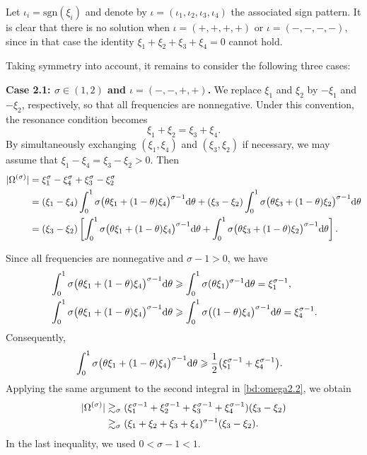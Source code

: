 \documentclass[UTF-8,reqno]{amsart}
\numberwithin{equation}{section}
\theoremstyle{definition}
\def\dif{{\mathord{{\rm d}}}}
\def\geq{\geqslant}
\def\dif{{\mathord{{\rm d}}}}
\def\geq{\geqslant}
\begin{document}
Let $\iota_i = \mathrm{sgn}(\xi_i)$ and denote by 
$\iota = (\iota_1,\iota_2,\iota_3,\iota_4)$ 
the associated sign pattern. 
It is clear that there is no solution when 
$\iota = (+,+,+,+)$ or $\iota = (-,-,-,-)$, 
since in that case the identity 
$\xi_1+\xi_2+\xi_3+\xi_4=0$ cannot hold.

Taking symmetry into account, it remains to consider the following three cases:

\textbf{Case 2.1: $\sigma\in(1,2)$ and
$\iota=(-,-,+,+)$.}
We replace $\xi_1$ and $\xi_2$ by $-\xi_1$ and $-\xi_2$,
respectively, so that all frequencies are nonnegative.
Under this convention, the resonance condition becomes
\[
    \xi_1+\xi_2=\xi_3+\xi_4.
\]
By simultaneously exchanging $(\xi_1,\xi_4)$ and
$(\xi_3,\xi_2)$ if necessary, we may assume that $ \xi_1-\xi_4=\xi_3-\xi_2>0.$
Then
\begin{align}
|\Omega^{(\sigma)}|
&=\xi_1^\sigma-\xi_4^\sigma
  +\xi_3^\sigma-\xi_2^\sigma
\notag\\
&=(\xi_1-\xi_4)
  \int_0^1
  \sigma\bigl(\theta\xi_1+(1-\theta)\xi_4\bigr)^{\sigma-1}
  \dif\theta 
 +(\xi_3-\xi_2)
  \int_0^1
  \sigma\bigl(\theta\xi_3+(1-\theta)\xi_2\bigr)^{\sigma-1}
  \dif\theta
\notag\\
&=(\xi_3-\xi_2)
\left[
  \int_0^1
  \sigma\bigl(\theta\xi_1+(1-\theta)\xi_4\bigr)^{\sigma-1}
  \dif\theta 
 +\int_0^1
  \sigma\bigl(\theta\xi_3+(1-\theta)\xi_2\bigr)^{\sigma-1}
  \dif\theta
\right].
\label{bd:omega2.2}
\end{align}

Since all frequencies are nonnegative and $\sigma-1>0$, we have
\begin{align*}
&\int_0^1
\sigma\bigl(\theta\xi_1+(1-\theta)\xi_4\bigr)^{\sigma-1}
\dif\theta
\geq
\int_0^1\sigma(\theta\xi_1)^{\sigma-1}\dif\theta
=\xi_1^{\sigma-1},
\\
&\int_0^1
\sigma\bigl(\theta\xi_1+(1-\theta)\xi_4\bigr)^{\sigma-1}
\dif\theta
\geq
\int_0^1\sigma\bigl((1-\theta)\xi_4\bigr)^{\sigma-1}
\dif\theta
=\xi_4^{\sigma-1}.
\end{align*}
Consequently,
\begin{align*}
&\int_0^1
\sigma\bigl(\theta\xi_1+(1-\theta)\xi_4\bigr)^{\sigma-1}
\dif\theta
\geq
\frac12\bigl(
\xi_1^{\sigma-1}+\xi_4^{\sigma-1}
\bigr).
\end{align*}
Applying the same argument to the second integral in
\eqref{bd:omega2.2}, we obtain
\begin{align}
|\Omega^{(\sigma)}|
&\gtrsim_\sigma
(\xi_1^{\sigma-1}
 +\xi_2^{\sigma-1}
 +\xi_3^{\sigma-1}
 +\xi_4^{\sigma-1})
(\xi_3-\xi_2)
\notag\\
&\gtrsim_\sigma
(\xi_1+\xi_2+\xi_3+\xi_4)^{\sigma-1}
(\xi_3-\xi_2).
\label{eq:omega-lower-case21}
\end{align}
In the last inequality, we used $0<\sigma-1<1$.
\end{document}

